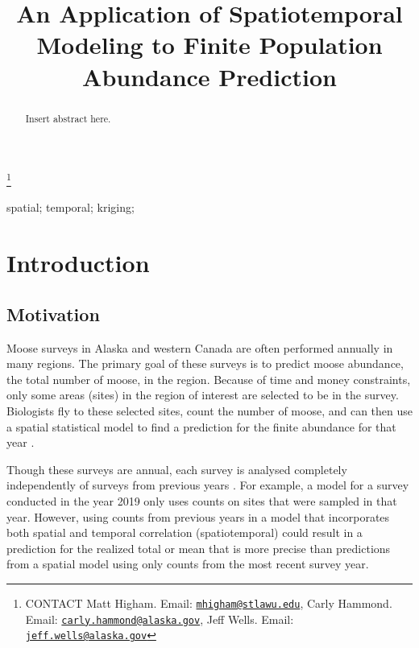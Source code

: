 \documentclass[]{interact}
\theoremstyle{plain}%
\theoremstyle{definition}
\theoremstyle{remark}
\begin{document}

\title{An Application of Spatiotemporal Modeling to Finite Population
Abundance Prediction}


\author{
}

\thanks{CONTACT Matt
Higham. Email: \href{mailto:mhigham@stlawu.edu}{\nolinkurl{mhigham@stlawu.edu}}, Carly
Hammond. Email: \href{mailto:carly.hammond@alaska.gov}{\nolinkurl{carly.hammond@alaska.gov}}, Jeff
Wells. Email: \href{mailto:jeff.wells@alaska.gov}{\nolinkurl{jeff.wells@alaska.gov}}}

\maketitle

\begin{abstract}
Insert abstract here.
\end{abstract}

\begin{keywords}
spatial; temporal; kriging;
\end{keywords}

\section{Introduction}

\subsection{Motivation}

Moose surveys in Alaska and western Canada are often performed annually
in many regions. The primary goal of these surveys is to predict moose
abundance, the total number of moose, in the region. Because of time and
money constraints, only some areas (sites) in the region of interest are
selected to be in the survey. Biologists fly to these selected sites,
count the number of moose, and can then use a spatial statistical model
to find a prediction for the finite abundance for that year
\citep{ver2008spatial}.

Though these surveys are annual, each survey is analysed completely
independently of surveys from previous years
\citep[e.g.][]{gasaway1986estimating, kellie_geospatial_2006, boertje2009managing, peters2014contrasting}.
For example, a model for a survey conducted in the year 2019 only uses
counts on sites that were sampled in that year. However, using counts
from previous years in a model that incorporates both spatial and
temporal correlation (spatiotemporal) could result in a prediction for
the realized total or mean that is more precise than predictions from a
spatial model using only counts from the most recent survey year.
\end{document}
